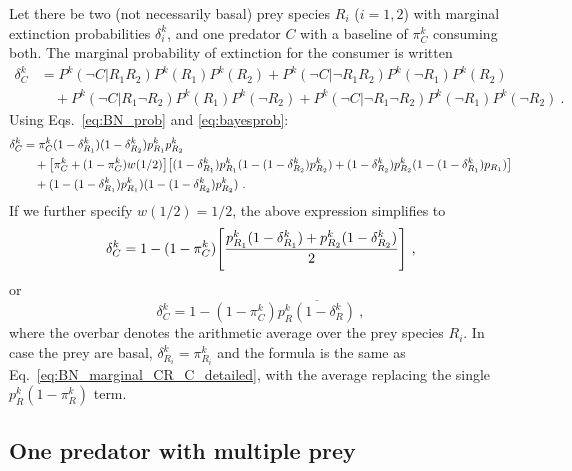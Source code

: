 \documentclass[11pt]{article}
\newcommand{\ol}[1]{\overline{#1}}
\let\originalleft\left
\let\originalright\right
\renewcommand{\left}{\mathopen{}\mathclose\bgroup\originalleft}
\renewcommand{\right}{\aftergroup\egroup\originalright}
\begin{document}
Let there be two (not necessarily basal) prey species $R_i$ ($i=1,2$) with marginal extinction probabilities $\delta_i^k$, and one predator $C$ with a baseline of $\pi_C^k$ consuming both. The marginal probability of extinction for the consumer is written
\begin{equation}
  \label{eq:BN_marginal_CRR}
  \begin{split}
    \delta_C^k &= P^k(\neg C|R_1 R_2) P^k(R_1) P^k(R_2) +
    P^k(\neg C|\neg R_1 R_2) P^k(\neg R_1) P^k(R_2)
    \\ &\quad + P^k(\neg C|R_1 \neg R_2) P^k(R_1) P^k(\neg R_2) +
    P^k(\neg C|\neg R_1 \neg R_2) P^k(\neg R_1) P^k(\neg R_2) \ .
  \end{split}
\end{equation}
Using Eqs.~\ref{eq:BN_prob} and \ref{eq:bayesprob}:
\begin{equation}
  \label{eq:BN_marginal_CRR_2}
  \begin{split}
    \delta_C^k &= \pi_C^k(1-\delta_{R_1}^k)(1-\delta_{R_2}^k)p_{R_1}^k p_{R_2}^k
    \\ &\quad + \left[\pi_C^k + (1-\pi_C^k) w(1/2) \right]
    \left[ (1-\delta_{R_1}^k) p_{R_1}^k (1-(1-\delta_{R_2}^k) p_{R_2}^k) +
      (1-\delta_{R_2}^k) p_{R_2}^k (1-(1-\delta_{R_1}^k) p_{R_1}) \right]
    \\ &\quad + (1-(1-\delta_{R_1}^k) p_{R_1}^k) (1-(1-\delta_{R_2}^k)
    p_{R_2}^k) \ .
  \end{split}
\end{equation}
If we further specify $w(1/2)=1/2$, the above expression simplifies to
\begin{equation}
  \label{eq:BN_marginal_CRR_3}
  \delta_C^k = 1 - (1 - \pi_C^k) \left[ \frac{p_{R_1}^k (1 - \delta_{R_1}^k) +
      p_{R_2}^k (1 - \delta_{R_2}^k)}{2} \right] \ ,
\end{equation}
or
\begin{equation}
  \label{eq:BN_marginal_CRR_4}
  \delta_C^k = 1 - (1 - \pi_C^k) \ol{p_R^k (1 - \delta_R^k)} \ ,
\end{equation}
where the overbar denotes the arithmetic average over the prey species $R_i$. In case the prey are basal, $\delta_{R_i}^k = \pi_{R_i}^k$ and the formula is the same as Eq.~\ref{eq:BN_marginal_CR_C_detailed}, with the average replacing the single $p_R^k (1 - \pi_R^k)$ term.

\subsection{One predator with multiple prey} \label{sec:CmanyR}
\end{document}
